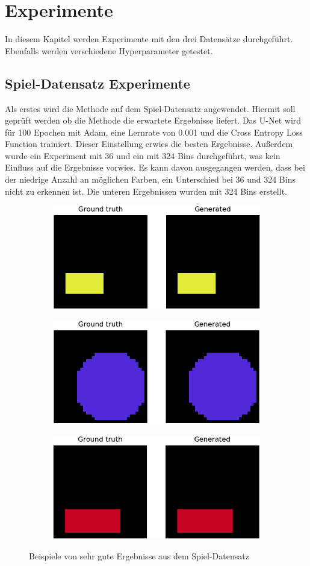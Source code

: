 \chapter{Experimente}
In diesem Kapitel werden Experimente mit den drei Datensätze durchgeführt. Ebenfalls werden verschiedene Hyperparameter getestet.

\section{Spiel-Datensatz Experimente}
\label{experimente:spiel}
Als erstes wird die Methode auf dem Spiel-Datensatz angewendet. Hiermit soll geprüft werden ob die Methode die erwartete
Ergebnisse liefert. Das U-Net wird für 100 Epochen mit Adam, eine Lernrate von 0.001 und die Cross Entropy Loss Function trainiert. Dieser
Einstellung erwies die besten Ergebnisse. Außerdem wurde ein Experiment mit 36 und ein mit 324 Bins durchgeführt, was kein Einfluss auf die 
Ergebnisse vorwies. Es kann davon ausgegangen werden, dass bei der niedrige Anzahl an möglichen Farben, ein Unterschied bei 36 und 324 Bins
nicht zu erkennen ist. Die unteren Ergebnissen wurden mit 324 Bins erstellt.

\begin{figure}[H]
  \vspace{1cm}
  \begin{subfigure}
    \centering
    \includegraphics[width=.32\textwidth]{resources/experiments/30.png}
  \end{subfigure}
  \begin{subfigure}
    \centering
    \includegraphics[width=.32\textwidth]{resources/experiments/31.png}
  \end{subfigure}
  \begin{subfigure}
    \centering
    \includegraphics[width=.32\textwidth]{resources/experiments/42.png}
  \end{subfigure}
  \caption{Beispiele von sehr gute Ergebnisse aus dem Spiel-Datensatz}
  \label{image:gute-ergebnisse-toy-dataset}
\end{figure}

